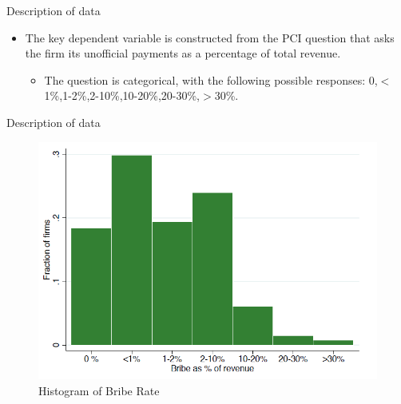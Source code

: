 \documentclass{beamer}
\begin{document}
\begin{frame}{Description of data}

\begin{itemize}
\item The key dependent variable is constructed from the PCI question that asks the firm its unofficial payments as a percentage of total revenue.
\begin{itemize}
\item The question is categorical, with the following possible responses: 0,$<$1\%,1-2\%,2-10\%,10-20\%,20-30\%,$>$30\%.
\end{itemize}

\end{itemize}

\end{frame}

\begin{frame}{Description of data}

\begin{figure}
\centering
\includegraphics[width=0.8\linewidth]{6.png}
\caption{Histogram of Bribe Rate}
\end{figure}

\end{frame}
\end{document}
